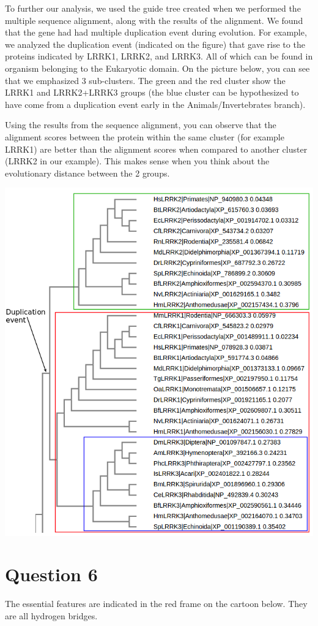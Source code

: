 \documentclass[11pt, a4paper,titlepage]{article}
\begin{document}
To further our analysis, we used the guide tree created when we
performed the multiple sequence alignment, along with the results of
the alignment. We found that the gene had had multiple duplication
event during evolution. For example, we analyzed the duplication event
(indicated on the figure) that gave rise to the proteins indicated by
LRRK1, LRRK2, and LRRK3. All of which can be found in organism
belonging to the Eukaryotic domain. On the picture below, you can see
that we emphasized 3 sub-clusters. The green and the red cluster show
the LRRK1 and LRRK2+LRRK3 groups (the blue cluster can be hypothesized
to have come from a duplication event early in the
Animals/Invertebrates branch).

Using the results from the sequence alignment, you can observe that
the alignment scores between the protein within the same cluster (for
example LRRK1) are better than the alignment scores when compared to
another cluster (LRRK2 in our example). This makes sense when you
think about the evolutionary distance between the 2 groups.

\includegraphics[width=17cm]{./Figures/5e.png}

\section*{Question 6}
The essential features are indicated in the red frame on the cartoon
below. They are all hydrogen bridges.
\end{document}
